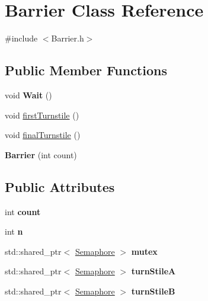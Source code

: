 \hypertarget{classBarrier}{}\section{Barrier Class Reference}
\label{classBarrier}


{\ttfamily \#include $<$Barrier.\+h$>$}

\subsection*{Public Member Functions}
\begin{DoxyCompactItemize}
\item 
void {\bfseries Wait} ()\hypertarget{classBarrier_a7de2afc6097b37c051d864bdf694c7e0}{}\label{classBarrier_a7de2afc6097b37c051d864bdf694c7e0}

\item 
void \hyperlink{classBarrier_a48006684f962b312bc0391629e08ca23}{first\+Turnstile} ()
\item 
void \hyperlink{classBarrier_af8ae6b2091ee7388d510fb7cb8ba2a1c}{final\+Turnstile} ()
\item 
{\bfseries Barrier} (int count)\hypertarget{classBarrier_a68730c862911d37696957056595aa604}{}\label{classBarrier_a68730c862911d37696957056595aa604}

\end{DoxyCompactItemize}
\subsection*{Public Attributes}
\begin{DoxyCompactItemize}
\item 
int {\bfseries count}\hypertarget{classBarrier_a261549fd3fc57eb5c4066c8188d25100}{}\label{classBarrier_a261549fd3fc57eb5c4066c8188d25100}

\item 
int {\bfseries n}\hypertarget{classBarrier_a7da307d8df6bd44ab4e804a94e0c80c2}{}\label{classBarrier_a7da307d8df6bd44ab4e804a94e0c80c2}

\item 
std\+::shared\+\_\+ptr$<$ \hyperlink{classSemaphore}{Semaphore} $>$ {\bfseries mutex}\hypertarget{classBarrier_a256676c1a44ee4971333d2963998b556}{}\label{classBarrier_a256676c1a44ee4971333d2963998b556}

\item 
std\+::shared\+\_\+ptr$<$ \hyperlink{classSemaphore}{Semaphore} $>$ {\bfseries turn\+StileA}\hypertarget{classBarrier_a1dc3b91b9ef0966f3792689ad17f555a}{}\label{classBarrier_a1dc3b91b9ef0966f3792689ad17f555a}

\item 
std\+::shared\+\_\+ptr$<$ \hyperlink{classSemaphore}{Semaphore} $>$ {\bfseries turn\+StileB}\hypertarget{classBarrier_ac982078845654123a6ad2a2dbb2346e2}{}\label{classBarrier_ac982078845654123a6ad2a2dbb2346e2}

\end{DoxyCompactItemize}



